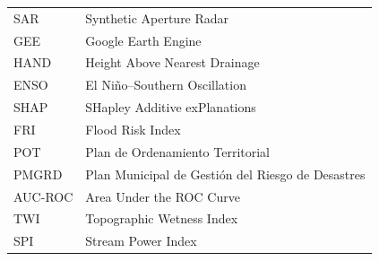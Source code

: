 \documentclass{article}
\begin{document}
\noindent
\begin{tabular}{@{}ll}
SAR & Synthetic Aperture Radar\\
GEE & Google Earth Engine\\
HAND & Height Above Nearest Drainage\\
ENSO & El Ni\~no--Southern Oscillation\\
SHAP & SHapley Additive exPlanations\\
FRI & Flood Risk Index\\
POT & Plan de Ordenamiento Territorial\\
PMGRD & Plan Municipal de Gesti\'on del Riesgo de Desastres\\
AUC-ROC & Area Under the ROC Curve\\
TWI & Topographic Wetness Index\\
SPI & Stream Power Index
\end{tabular}




\end{document}
